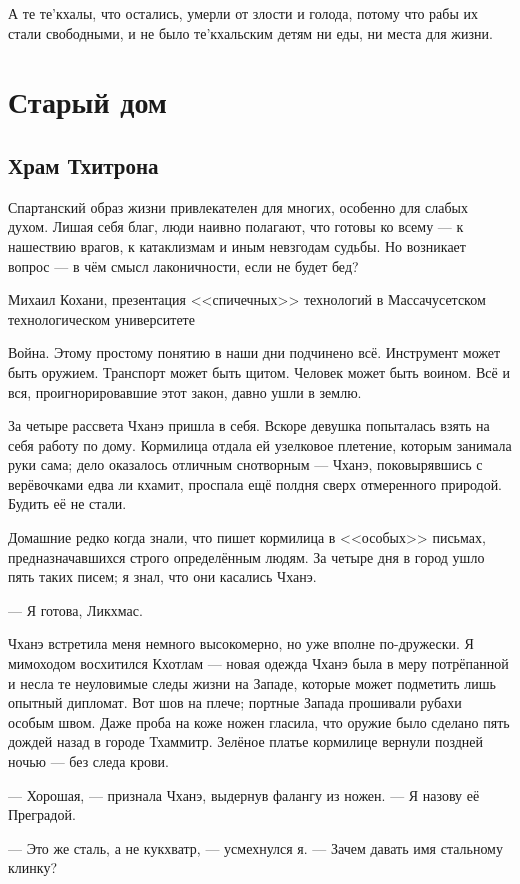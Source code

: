 А те те'кхалы, что остались, умерли от злости и голода, потому что рабы их стали свободными, и не было те'кхальским детям ни еды, ни места для жизни.

\chapter{Старый дом}

\section{Храм Тхитрона}

\epigraph
{Спартанский образ жизни привлекателен для многих, особенно для слабых духом.
Лишая себя благ, люди наивно полагают, что готовы ко всему --- к нашествию врагов, к катаклизмам и иным невзгодам судьбы.
Но возникает вопрос --- в чём смысл лаконичности, если не будет бед?}
{Михаил Кохани, презентация <<спичечных>> технологий в Массачусетском технологическом университете}

Война.
Этому простому понятию в наши дни подчинено всё.
Инструмент может быть оружием.
Транспорт может быть щитом.
Человек может быть воином.
Всё и вся, проигнорировавшие этот закон, давно ушли в землю.

За четыре рассвета Чханэ пришла в себя.
Вскоре девушка попыталась взять на себя работу по дому.
Кормилица отдала ей узелковое плетение, которым занимала руки сама;
дело оказалось отличным снотворным --- Чханэ, поковырявшись с верёвочками едва ли кхамит, проспала ещё полдня сверх отмеренного природой.
Будить её не стали.

Домашние редко когда знали, что пишет кормилица в <<особых>> письмах, предназначавшихся строго определённым людям.
За четыре дня в город ушло пять таких писем;
я знал, что они касались Чханэ.

--- Я готова, Ликхмас.

Чханэ встретила меня немного высокомерно, но уже вполне по-дружески.
Я мимоходом восхитился Кхотлам --- новая одежда Чханэ была в меру потрёпанной и несла те неуловимые следы жизни на Западе, которые может подметить лишь опытный дипломат.
Вот шов на плече;
портные Запада прошивали рубахи особым швом.
Даже проба на коже ножен гласила, что оружие было сделано пять дождей назад в городе Тхаммитр.
Зелёное платье кормилице вернули поздней ночью --- без следа крови.

--- Хорошая, --- признала Чханэ, выдернув фалангу из ножен.
--- Я назову её Преградой.

--- Это же сталь, а не кукхватр, --- усмехнулся я.
--- Зачем давать имя стальному клинку?

